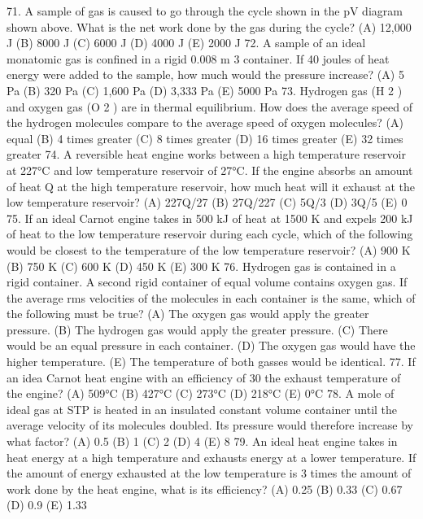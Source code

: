 71. A sample of gas is caused to go through the cycle shown in the pV diagram shown above. What is the net work
done by the gas during the cycle?
(A) 12,000 J (B) 8000 J (C) 6000 J (D) 4000 J (E) 2000 J
72. A sample of an ideal monatomic gas is confined in a rigid 0.008 m 3 container. If 40 joules of heat energy were
added to the sample, how much would the pressure increase?
(A) 5 Pa (B) 320 Pa (C) 1,600 Pa (D) 3,333 Pa (E) 5000 Pa
73. Hydrogen gas (H 2 ) and oxygen gas (O 2 ) are in thermal equilibrium. How does the average speed of the
hydrogen molecules compare to the average speed of oxygen molecules?
(A) equal (B) 4 times greater (C) 8 times greater (D) 16 times greater (E) 32 times greater
74. A reversible heat engine works between a high temperature reservoir at 227°C and low temperature reservoir of
27°C. If the engine absorbs an amount of heat Q at the high temperature reservoir, how much heat will it
exhaust at the low temperature reservoir?
(A) 227Q/27 (B) 27Q/227 (C) 5Q/3 (D) 3Q/5 (E) 0
75. If an ideal Carnot engine takes in 500 kJ of heat at 1500 K and expels 200 kJ of heat to the low temperature
reservoir during each cycle, which of the following would be closest to the temperature of the low temperature
reservoir?
(A) 900 K (B) 750 K (C) 600 K (D) 450 K (E) 300 K
76. Hydrogen gas is contained in a rigid container. A second rigid container of equal volume contains oxygen gas.
If the average rms velocities of the molecules in each container is the same, which of the following must be
true?
(A) The oxygen gas would apply the greater pressure.
(B) The hydrogen gas would apply the greater pressure.
(C) There would be an equal pressure in each container.
(D) The oxygen gas would have the higher temperature.
(E) The temperature of both gasses would be identical.
77. If an idea Carnot heat engine with an efficiency of 30%
the exhaust temperature of the engine?
(A) 509°C (B) 427°C (C) 273°C (D) 218°C (E) 0°C
78. A mole of ideal gas at STP is heated in an insulated constant volume container until the average velocity of its
molecules doubled. Its pressure would therefore increase by what factor?
(A) 0.5 (B) 1 (C) 2 (D) 4 (E) 8
79. An ideal heat engine takes in heat energy at a high temperature and exhausts energy at a lower temperature. If
the amount of energy exhausted at the low temperature is 3 times the amount of work done by the heat engine,
what is its efficiency?
(A) 0.25 (B) 0.33 (C) 0.67 (D) 0.9 (E) 1.33




